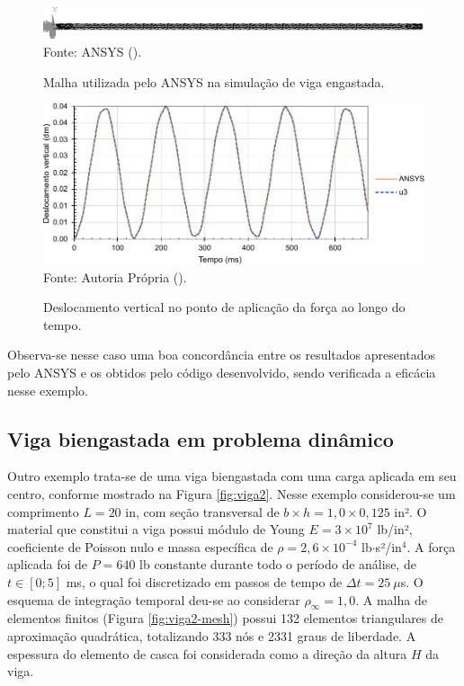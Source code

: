 \begin{figure}[h!]
    \centering
    \caption{Malha utilizada pelo ANSYS na simulação de viga engastada.}
    \includegraphics[width=\linewidth]{Figuras/vigas/ANSYSmesh1.png}
    \\Fonte: ANSYS (\the\year).
    \label{fig:beamANSYS1}
\end{figure}

\begin{figure}[h!]
    \centering
    \caption{Deslocamento vertical no ponto de aplicação da força ao longo do tempo.}
    \includegraphics[width=.8\linewidth]{Figuras/vigas/res1.pdf}
    \\Fonte: Autoria Própria (\the\year).
    \label{fig:res-viga1}
\end{figure}

Observa-se nesse caso uma boa concordância entre os resultados apresentados pelo ANSYS e os obtidos pelo código desenvolvido, sendo verificada a eficácia nesse exemplo.

\subsection{Viga biengastada em problema dinâmico} \label{Ap:DinBeam2}

Outro exemplo trata-se de uma viga biengastada com uma carga aplicada em seu centro, conforme mostrado na Figura \ref{fig:viga2}. Nesse exemplo considerou-se um comprimento $L=20$ in, com seção transversal de $b\times h=1,0\times0,125$ in². O material que constitui a viga possui módulo de Young $E=3\times10^{7}$ lb/in², coeficiente de Poisson nulo e massa específica de $\rho=2,6\times10^{-4}$ lb$\cdot$s²/in$^4$. A força aplicada foi de $P=640$ lb constante durante todo o período de análise, de $t\in[0;5]$ ms, o qual foi discretizado em passos de tempo de $\Delta t=25\ \mu$s. O esquema de integração temporal deu-se ao considerar $\rho_\infty=1,0$. A malha de elementos finitos (Figura \ref{fig:viga2-mesh}) possui 132 elementos triangulares de aproximação quadrática, totalizando 333 nós e 2331 graus de liberdade. A espessura do elemento de casca foi considerada como a direção da altura $H$ da viga.

